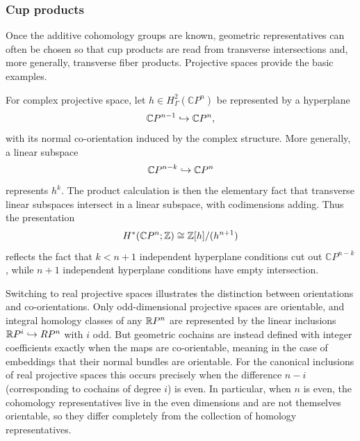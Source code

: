 \subsubsection{Cup products}

Once the additive cohomology groups are known, geometric representatives can often be chosen so that cup products are read from transverse intersections and, more generally, transverse fiber products.
Projective spaces provide the basic examples.

For complex projective space, let $h \in H^2_\Gamma(\mathbb{C}P^n)$ be represented by a hyperplane
\[
\mathbb{C}P^{n-1} \hookrightarrow \mathbb{C}P^n,
\]
with its normal co-orientation induced by the complex structure.
More generally, a linear subspace
\[
\mathbb{C}P^{n-k} \hookrightarrow \mathbb{C}P^n
\]
represents $h^k$.
The product calculation is then the elementary fact that transverse linear subspaces intersect in a linear subspace, with codimensions adding.
Thus the presentation
\[
H^*(\mathbb{C}P^n;\mathbb{Z}) \cong \mathbb{Z}[h]/(h^{n+1})
\]
reflects the fact that $k <n+1$ independent hyperplane conditions cut out $\mathbb{C}P^{n-k}$, while $n+1$ independent hyperplane conditions have empty intersection.

\medskip

Switching to real projective spaces illustrates the distinction between orientations and co-orientations.
Only odd-dimensional projective spaces are orientable, and integral homology classes of any $\mathbb{R} P^n$ are represented by the linear inclusions $\mathbb{R} P^i \hookrightarrow RP^n$ with $i$ odd.
But geometric cochains are instead defined with integer coefficients exactly when the maps are co-orientable, meaning in the case of embeddings that their normal bundles are orientable.
For the canonical inclusions of real projective spaces this occurs precisely when the difference $n-i$ (corresponding to cochains of degree $i$) is even.
In particular, when $n$ is even, the cohomology representatives live in the even dimensions and are not themselves orientable, so they differ completely from the collection of homology representatives.

